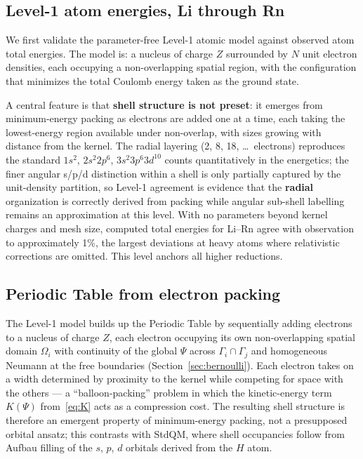 \documentclass[11pt]{article}
\begin{document}
\subsection{Level-1 atom energies, Li through Rn}\label{sec:atoms}

We first validate the parameter-free Level-1 atomic model against observed atom total energies. The model is: a nucleus of charge $Z$ surrounded by $N$ unit electron densities, each occupying a non-overlapping spatial region, with the configuration that minimizes the total Coulomb energy taken as the ground state.

A central feature is that \textbf{shell structure is not preset}: it emerges from minimum-energy packing as electrons are added one at a time, each taking the lowest-energy region available under non-overlap, with sizes growing with distance from the kernel. The radial layering (2, 8, 18, \ldots\ electrons) reproduces the standard $1s^2$, $2s^2 2p^6$, $3s^2 3p^6 3d^{10}$ counts quantitatively in the energetics; the finer angular s/p/d distinction within a shell is only partially captured by the unit-density partition, so Level-1 agreement is evidence that the \textbf{radial} organization is correctly derived from packing while angular sub-shell labelling remains an approximation at this level. With no parameters beyond kernel charges and mesh size, computed total energies for Li--Rn agree with observation to approximately 1\%, the largest deviations at heavy atoms where relativistic corrections are omitted. This level anchors all higher reductions.

\subsection{Periodic Table from electron packing}\label{sec:pt-packing}

The Level-1 model builds up the Periodic Table by sequentially adding electrons to a nucleus of charge $Z$, each electron occupying its own non-overlapping spatial domain $\Omega_i$ with continuity of the global $\Psi$ across $\Gamma_i \cap \Gamma_j$ and homogeneous Neumann at the free boundaries (Section~\ref{sec:bernoulli}). Each electron takes on a width determined by proximity to the kernel while competing for space with the others --- a ``balloon-packing'' problem in which the kinetic-energy term $K(\Psi)$ from~\eqref{eq:K} acts as a compression cost. The resulting shell structure is therefore an emergent property of minimum-energy packing, not a presupposed orbital ansatz; this contrasts with StdQM, where shell occupancies follow from Aufbau filling of the $s$, $p$, $d$ orbitals derived from the $H$ atom.
\end{document}
